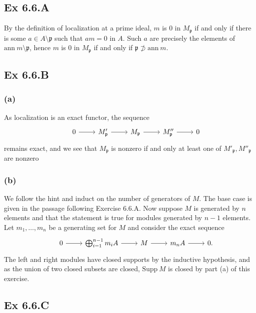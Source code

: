 \documentclass{article}
\theoremstyle{definition}
\newcommand{\ann}{\text{ann}}
\newcommand{\supp}{\text{Supp}}
\begin{document}
\subsection*{Ex 6.6.A}

By the definition of localization at a prime ideal, $m$ is $0$ in
$M_{\mathfrak{p}}$ if and only if there is some $a \in A \setminus
	\mathfrak{p}$ such that $am = 0$ in $A$. Such $a$ are precisely the elements of
$\ann\ m \setminus \mathfrak{p}$, hence $m$ is $0$ in $M_{\mathfrak{p}}$ if and
only if $\mathfrak{p} \not \supset \ann\ m$.

\subsection*{Ex 6.6.B}
\subsubsection*{(a)}

As localization is an exact functor, the sequence
\[
	\begin{tikzcd}
		& 0
		\ar[r]
		& M'_{\mathfrak{p}}
		\ar[r]
		& M_{\mathfrak{p}}
		\ar[r]
		& M_{\mathfrak{p}}''
		\ar[r]
		& 0
	\end{tikzcd}
\]
remains exact, and we see that $M_{\mathfrak{p}}$ is nonzero if and only at
least one of $M'_{\mathfrak{p}}, M''_{\mathfrak{p}}$ are nonzero

\subsubsection*{(b)}

We follow the hint and induct on the number of generators of $M$. The base case
is given in the passage following Exercise 6.6.A. Now suppose $M$ is generated
by $n$ elements and that the statement is true for modules generated by $n - 1$
elements. Let $m_{1}, \ldots, m_{n}$ be a generating set for $M$ and consider the exact
sequence
\[
	\begin{tikzcd}
		& 0
		\ar[r]
		& \bigoplus_{i = 1}^{n - 1} m_i A
		\ar[r]
		& M
		\ar[r]
		& m_n A
		\ar[r]
		& 0.
	\end{tikzcd}
\]
The left and right modules have closed supports by the inductive hypothesis,
and as the union of two closed subsets are closed, $\supp\ M$ is closed by part
(a) of this exercise.

\subsection*{Ex 6.6.C}
\end{document}
